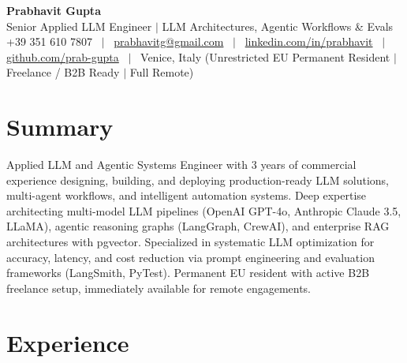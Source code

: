 \documentclass[a4paper,10pt]{article}
\begin{document}
\begin{minipage}[c]{0.80\textwidth}
  {\Huge\bfseries Prabhavit Gupta}\\[3pt]
  {\color{accent}\large Senior Applied LLM Engineer $\vert$ LLM Architectures, Agentic Workflows \& Evals}\\[6pt]
  {\footnotesize +39 351 610 7807 ~$\vert$~
  \href{mailto:prabhavitg@gmail.com}{prabhavitg@gmail.com} ~$\vert$~
  \href{https://www.linkedin.com/in/prabhavit/}{linkedin.com/in/prabhavit} ~$\vert$~
  \href{https://github.com/prab-gupta}{github.com/prab-gupta} ~$\vert$~
  Venice, Italy (Unrestricted EU Permanent Resident $\vert$ Freelance / B2B Ready $\vert$ Full Remote)}
\end{minipage}\hfill

\section{Summary}
Applied LLM and Agentic Systems Engineer with 3 years of commercial experience designing, building, and deploying production-ready LLM solutions, multi-agent workflows, and intelligent automation systems. Deep expertise architecting multi-model LLM pipelines (OpenAI GPT-4o, Anthropic Claude 3.5, LLaMA), agentic reasoning graphs (LangGraph, CrewAI), and enterprise RAG architectures with pgvector. Specialized in systematic LLM optimization for accuracy, latency, and cost reduction via prompt engineering and evaluation frameworks (LangSmith, PyTest). Permanent EU resident with active B2B freelance setup, immediately available for remote engagements.

\section{Experience}
\end{document}

